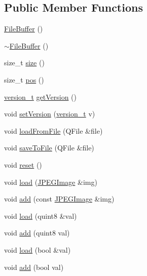 \subsection*{Public Member Functions}
\begin{DoxyCompactItemize}
\item 
\hyperlink{classShipCAD_1_1FileBuffer_ab243cfcb8a68ce791103594e974ee9ba}{File\+Buffer} ()
\item 
\hyperlink{classShipCAD_1_1FileBuffer_a397c9a755598f9939eb30460b605d44c}{$\sim$\+File\+Buffer} ()
\item 
size\+\_\+t \hyperlink{classShipCAD_1_1FileBuffer_a51dc1007457d999ce374afd6a6ae29f8}{size} ()
\item 
size\+\_\+t \hyperlink{classShipCAD_1_1FileBuffer_a7feeac3f68df96065a3238cbca9a5151}{pos} ()
\item 
\hyperlink{namespaceShipCAD_af3a6fa23a7318acbda7b0066b53d694f}{version\+\_\+t} \hyperlink{classShipCAD_1_1FileBuffer_a06f87b30f5fd091cc5c270964ea16770}{get\+Version} ()
\item 
void \hyperlink{classShipCAD_1_1FileBuffer_a66c14f8f21b9f77febd154aee9565f0b}{set\+Version} (\hyperlink{namespaceShipCAD_af3a6fa23a7318acbda7b0066b53d694f}{version\+\_\+t} v)
\item 
void \hyperlink{classShipCAD_1_1FileBuffer_afe2a6e56770eed6bf9df894baa28c9fe}{load\+From\+File} (Q\+File \&file)
\item 
void \hyperlink{classShipCAD_1_1FileBuffer_adcc7e54a07f39ad930df82da9c3c70fd}{save\+To\+File} (Q\+File \&file)
\item 
void \hyperlink{classShipCAD_1_1FileBuffer_af59c26297994b38aabc4bc678d04c246}{reset} ()
\item 
void \hyperlink{classShipCAD_1_1FileBuffer_a86223c54bcf111ef205c9d651e0b9a66}{load} (\hyperlink{structShipCAD_1_1JPEGImage}{J\+P\+E\+G\+Image} \&img)
\item 
void \hyperlink{classShipCAD_1_1FileBuffer_a9a5d46b2c6d568ee2cdef110d4773e73}{add} (const \hyperlink{structShipCAD_1_1JPEGImage}{J\+P\+E\+G\+Image} \&img)
\item 
void \hyperlink{classShipCAD_1_1FileBuffer_ab196d459581b5c877ebea2f567e9bda8}{load} (quint8 \&val)
\item 
void \hyperlink{classShipCAD_1_1FileBuffer_afb11c583e5d3a7a580e5f88004d6c7e3}{add} (quint8 val)
\item 
void \hyperlink{classShipCAD_1_1FileBuffer_ad1aebcc97e364569934c66eec5a87485}{load} (bool \&val)
\item 
void \hyperlink{classShipCAD_1_1FileBuffer_a7cb4395eae7ffa405290c3bed9890bee}{add} (bool val)

\end{DoxyCompactItemize}
